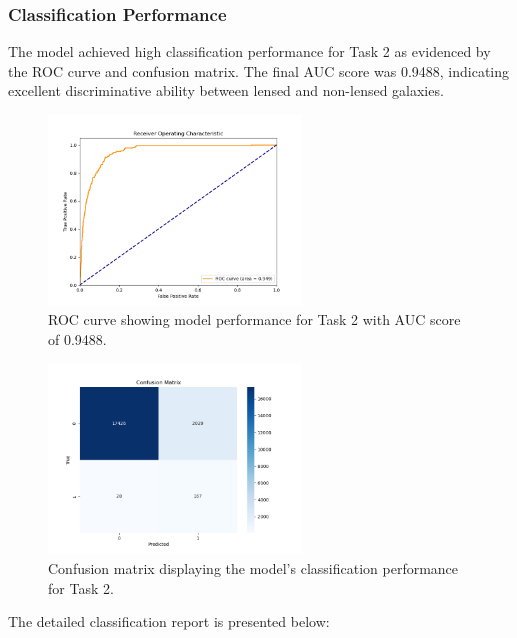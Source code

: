\documentclass[11pt,a4paper]{article}
\begin{document}
\subsubsection{Classification Performance}

The model achieved high classification performance for Task 2 as evidenced by the ROC curve and confusion matrix. The final AUC score was 0.9488, indicating excellent discriminative ability between lensed and non-lensed galaxies.

\begin{figure}[H]
    \centering
    \includegraphics[width=0.6\textwidth]{../Task2/results/roc_curve.png}
    \caption{ROC curve showing model performance for Task 2 with AUC score of 0.9488.}
    \label{fig:roc_curve}
\end{figure}

\begin{figure}[H]
    \centering
    \includegraphics[width=0.6\textwidth]{../Task2/results/confusion_matrix.png}
    \caption{Confusion matrix displaying the model's classification performance for Task 2.}
    \label{fig:confusion_matrix}
\end{figure}

The detailed classification report is presented below:
\end{document}
